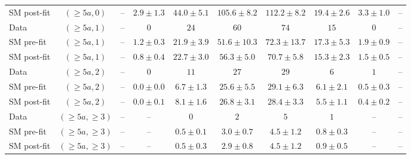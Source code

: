 \begin{table}[h!]
{\begin{tabular}{lccccccccc}
 SM post-fit & $(\geq 5a,0)$ & -- & $2.9\pm1.3$ & $44.0\pm5.1$ & $105.6\pm8.2$ & $112.2\pm8.2$ & $19.4\pm2.6$ & $3.3\pm1.0$ & -- \\[0.5ex]
 Data & $(\geq 5a,1)$ & -- & $0$ & $24$ & $60$ & $74$ & $15$ & $0$ & -- \\[0.5ex]
 SM pre-fit & $(\geq 5a,1)$ & -- & $1.2\pm0.3$ & $21.9\pm3.9$ & $51.6\pm10.3$ & $72.3\pm13.7$ & $17.3\pm5.3$ & $1.9\pm0.9$ & -- \\[0.5ex]
 SM post-fit & $(\geq 5a,1)$ & -- & $0.8\pm0.4$ & $22.7\pm3.0$ & $56.3\pm5.0$ & $70.7\pm5.8$ & $15.3\pm2.3$ & $1.5\pm0.5$ & -- \\[0.5ex]
 Data & $(\geq 5a,2)$ & -- & $0$ & $11$ & $27$ & $29$ & $6$ & $1$ & -- \\[0.5ex]
 SM pre-fit & $(\geq 5a,2)$ & -- & $0.0\pm0.0$ & $6.7\pm1.3$ & $25.6\pm5.5$ & $29.1\pm6.3$ & $6.1\pm2.1$ & $0.5\pm0.3$ & -- \\[0.5ex]
 SM post-fit & $(\geq 5a,2)$ & -- & $0.0\pm0.1$ & $8.1\pm1.6$ & $26.8\pm3.1$ & $28.4\pm3.3$ & $5.5\pm1.1$ & $0.4\pm0.2$ & -- \\[0.5ex]
 Data & $(\geq 5a,\geq 3)$ & -- & -- & $0$ & $2$ & $5$ & $1$ & -- & -- \\[0.5ex]
 SM pre-fit & $(\geq 5a,\geq 3)$ & -- & -- & $0.5\pm0.1$ & $3.0\pm0.7$ & $4.5\pm1.2$ & $0.8\pm0.3$ & -- & -- \\[0.5ex]
 SM post-fit & $(\geq 5a,\geq 3)$ & -- & -- & $0.5\pm0.3$ & $2.9\pm0.8$ & $4.5\pm1.2$ & $0.9\pm0.5$ & -- & -- \\[0.5ex]
	\hline
	\hline
\end{tabular}}
\end{table}
